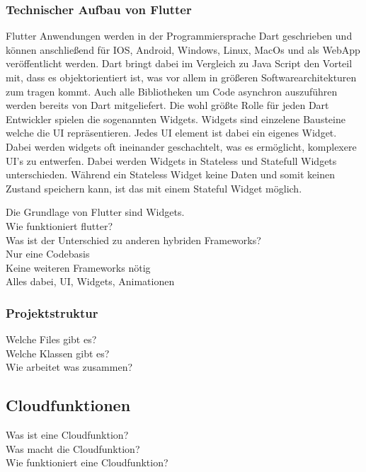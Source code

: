 \subsubsection{Technischer Aufbau von Flutter}
Flutter Anwendungen werden in der Programmiersprache Dart geschrieben und können anschließend für IOS, Android, Windows, Linux, MacOs und als WebApp veröffentlicht werden. Dart bringt dabei im Vergleich zu Java Script den Vorteil mit, dass es objektorientiert ist, was vor allem in größeren Softwarearchitekturen zum tragen kommt. Auch alle Bibliotheken um Code asynchron auszuführen werden bereits von Dart mitgeliefert. 
Die wohl größte Rolle für jeden Dart Entwickler spielen die sogenannten Widgets. Widgets sind einzelene Bausteine welche die UI repräsentieren. Jedes UI element ist dabei ein eigenes Widget. Dabei werden widgets oft ineinander geschachtelt, was es ermöglicht, komplexere UI’s zu entwerfen. Dabei werden Widgets in Stateless und Statefull Widgets unterschieden. Während ein Stateless Widget keine Daten und somit keinen Zustand speichern kann, ist das mit einem Stateful Widget möglich.

Die Grundlage von Flutter sind Widgets. \\
Wie funktioniert flutter?   \\
Was ist der Unterschied zu anderen hybriden Frameworks?  \\ 
Nur eine Codebasis \\
Keine weiteren Frameworks nötig\\
Alles dabei, UI, Widgets, Animationen\\

\subsubsection{Projektstruktur}
Welche Files gibt es? \\
Welche Klassen gibt es? \\
Wie arbeitet was zusammen? \\

\subsection{Cloudfunktionen}
Was ist eine Cloudfunktion? \\
Was macht die Cloudfunktion? \\
Wie funktioniert eine Cloudfunktion? \\

